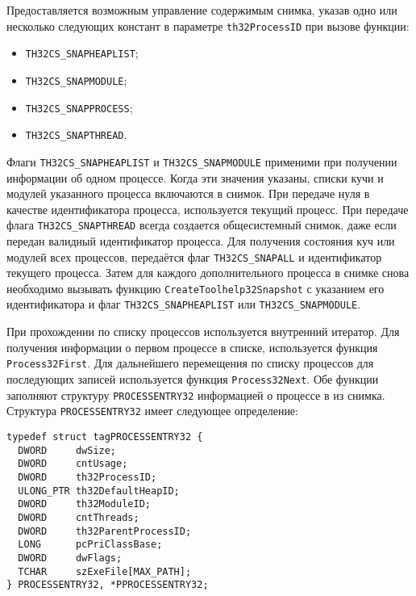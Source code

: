 Предоставляется возможным управление содержимым снимка, указав одно или
несколько следующих констант в параметре \texttt{th32ProcessID} при вызове
функции:
\begin{itemize}
\item \texttt{TH32CS\_SNAPHEAPLIST};
\item \texttt{TH32CS\_SNAPMODULE};
\item \texttt{TH32CS\_SNAPPROCESS};
\item \texttt{TH32CS\_SNAPTHREAD}.
\end{itemize}

Флаги \texttt{TH32CS\_SNAPHEAPLIST} и \texttt{TH32CS\_SNAPMODULE} применими при
получении информации об одном процессе. Когда эти значения указаны, списки кучи
и модулей указанного процесса включаются в снимок. При передаче нуля в качестве
идентификатора процесса, используется текущий процесс. При передаче флага
\texttt{TH32CS\_SNAPTHREAD} всегда создается общесистемный снимок, даже если
передан валидный идентификатор процесса.
Для получения состояния куч или модулей всех процессов, передаётся флаг
\texttt{TH32CS\_SNAPALL} и идентификатор текущего процесса. Затем для каждого
дополнительного процесса в снимке снова необходимо вызывать функцию
\texttt{CreateToolhelp32Snapshot} с указанием его идентификатора и флаг
\texttt{TH32CS\_SNAPHEAPLIST} или \texttt{TH32CS\_SNAPMODULE}.

При прохождении по списку процессов используется внутренний итератор. Для
получения информации о первом процессе в списке, используется функция
\texttt{Process32First}. Для дальнейшего перемещения по списку процессов для
последующих записей используется функция \texttt{Process32Next}. Обе функции
заполняют структуру \texttt{PROCESSENTRY32} информацией о процессе в из снимка.
Структура \texttt{PROCESSENTRY32} имеет следующее определение:

\medskip
\begin{adjustwidth}{\fivecharsapprox}{}
\begin{lstlisting}[basicstyle=\fontencoding{T1}\small\ttfamily]
typedef struct tagPROCESSENTRY32 {
  DWORD     dwSize;
  DWORD     cntUsage;
  DWORD     th32ProcessID;
  ULONG_PTR th32DefaultHeapID;
  DWORD     th32ModuleID;
  DWORD     cntThreads;
  DWORD     th32ParentProcessID;
  LONG      pcPriClassBase;
  DWORD     dwFlags;
  TCHAR     szExeFile[MAX_PATH];
} PROCESSENTRY32, *PPROCESSENTRY32;
\end{lstlisting}
\end{adjustwidth}
\medskip

